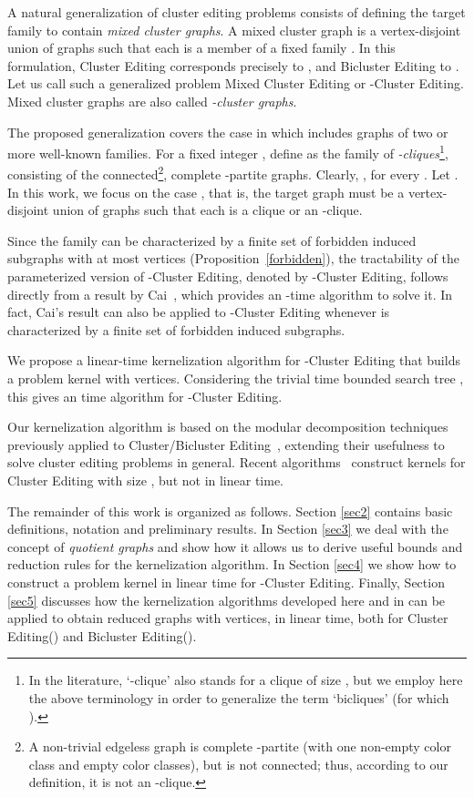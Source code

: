 \documentclass[12pt]{article}
\begin{document}
A natural generalization of cluster editing problems consists of
defining the target family to contain {\em mixed cluster graphs}. A mixed cluster graph is
a vertex-disjoint union of graphs 
such that each  is a member of a fixed family .
In this formulation, {\sc Cluster Editing} corresponds precisely to
, and {\sc Bicluster Editing} to
. Let us call such
a generalized problem {\sc Mixed Cluster Editing} or {\sc -Cluster Editing}.
Mixed cluster graphs are also called {\em -cluster graphs}.

The proposed generalization covers the case in which 
includes graphs of two or more well-known families. For a fixed integer
, define  as the family of {\em
-cliques}\footnote{In the literature, `-clique' also stands for a clique of size ,
but we employ here the above terminology in order to generalize
the term `bicliques' (for which ).}, consisting of the connected\footnote{A non-trivial edgeless graph is complete -partite (with one non-empty color class
and  empty color classes), but is not connected; thus, according to our definition, it is not an -clique.}, complete -partite
graphs.
Clearly, , for every .
Let .
In this work, we focus on the case ,
that is, the target graph must be a vertex-disjoint union of graphs 
such that each  is a clique or an -clique.

Since the family  can be characterized by a finite set of forbidden induced subgraphs
with at most  vertices
(Proposition~\ref{forbidden}), the tractability of the parameterized version of
{\sc -Cluster Editing}, denoted by {\sc-Cluster Editing},
follows directly from a result by Cai~\cite{C1996}, which provides an -time
algorithm to solve it. In fact, Cai's result can also be applied
to {\sc -Cluster Editing} whenever  is characterized
by a finite set of forbidden induced subgraphs.

We propose a linear-time kernelization algorithm for {\sc -Cluster Editing}
that builds a problem kernel with  vertices.
Considering the trivial  time
bounded search tree \cite{NR2000}, this gives an
 time algorithm for {\sc -Cluster Editing}.

Our kernelization algorithm is based on the modular decomposition techniques
previously applied to {\sc Cluster/Bicluster
Editing}~\cite{DSPS2006,DSPS2009}, extending their usefulness to solve
cluster editing problems in general.
Recent algorithms~\cite{CM2011,G2007,YZ2007} construct kernels for {\sc Cluster Editing} with size , but not in linear time.


The remainder of this work is organized as follows. Section
\ref{sec2} contains basic definitions, notation and preliminary results.
In Section \ref{sec3} we deal with the concept of {\em quotient graphs} and show how it allows us to derive
useful bounds and reduction rules for the kernelization algorithm.
In Section \ref{sec4} we show how to construct a problem
kernel in linear time for {\sc -Cluster Editing}.
Finally, Section \ref{sec5} discusses how the kernelization algorithms developed here and in \cite{DSPS2006,DSPS2009}
can be applied to obtain reduced graphs with  vertices, in linear time, both for {\sc Cluster Editing()} and {\sc Bicluster Editing()}.
\end{document}
